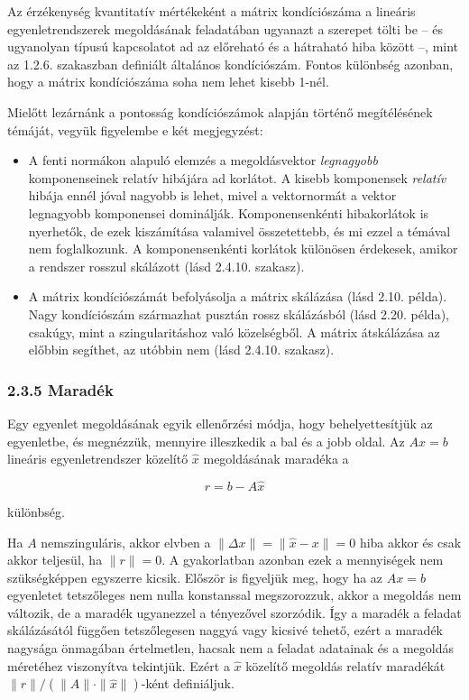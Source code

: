 \documentclass[
  magyar,
  11pt]{article}
\begin{document}
Az érzékenység kvantitatív mértékeként a mátrix kondíciószáma a lineáris
egyenletrendszerek megoldásának feladatában ugyanazt a szerepet tölti be
-- és ugyanolyan típusú kapcsolatot ad az előreható és a hátraható hiba
között --, mint az 1.2.6. szakaszban definiált általános kondíciószám.
Fontos különbség azonban, hogy a mátrix kondíciószáma soha nem lehet
kisebb 1-nél.

Mielőtt lezárnánk a pontosság kondíciószámok alapján történő
megítélésének témáját, vegyük figyelembe e két megjegyzést:

\begin{itemize}
\item
  A fenti normákon alapuló elemzés a megoldásvektor \emph{legnagyobb}
  komponenseinek relatív hibájára ad korlátot. A kisebb komponensek
  \emph{relatív} hibája ennél jóval nagyobb is lehet, mivel a
  vektornormát a vektor legnagyobb komponensei dominálják.
  Komponensenkénti hibakorlátok is nyerhetők, de ezek kiszámítása
  valamivel összetettebb, és mi ezzel a témával nem foglalkozunk. A
  komponensenkénti korlátok különösen érdekesek, amikor a rendszer
  rosszul skálázott (lásd 2.4.10. szakasz).
\item
  A mátrix kondíciószámát befolyásolja a mátrix skálázása (lásd 2.10.
  példa). Nagy kondíciószám származhat pusztán rossz skálázásból (lásd
  2.20. példa), csakúgy, mint a szingularitáshoz való közelségből. A
  mátrix átskálázása az előbbin segíthet, az utóbbin nem (lásd 2.4.10.
  szakasz).
\end{itemize}

\subsubsection{2.3.5 Maradék}\label{maraduxe9k}

Egy egyenlet megoldásának egyik ellenőrzési módja, hogy behelyettesítjük
az egyenletbe, és megnézzük, mennyire illeszkedik a bal és a jobb oldal.
Az \(Ax = b\) lineáris egyenletrendszer közelítő \(\hat{x}\)
megoldásának maradéka a

\[r = b - A\hat{x}\]

különbség.

Ha \(A\) nemszinguláris, akkor elvben a
\(\|\Delta x\| = \|\hat{x} - x\| = 0\) hiba akkor és csak akkor
teljesül, ha \(\|r\| = 0\). A gyakorlatban azonban ezek a mennyiségek
nem szükségképpen egyszerre kicsik. Először is figyeljük meg, hogy ha az
\(Ax = b\) egyenletet tetszőleges nem nulla konstanssal megszorozzuk,
akkor a megoldás nem változik, de a maradék ugyanezzel a tényezővel
szorzódik. Így a maradék a feladat skálázásától függően tetszőlegesen
naggyá vagy kicsivé tehető, ezért a maradék nagysága önmagában
értelmetlen, hacsak nem a feladat adatainak és a megoldás méretéhez
viszonyítva tekintjük. Ezért a \(\hat{x}\) közelítő megoldás relatív
maradékát \(\|r\|/(\|A\|\cdot\|\hat{x}\|)\)-ként definiáljuk.
\end{document}
